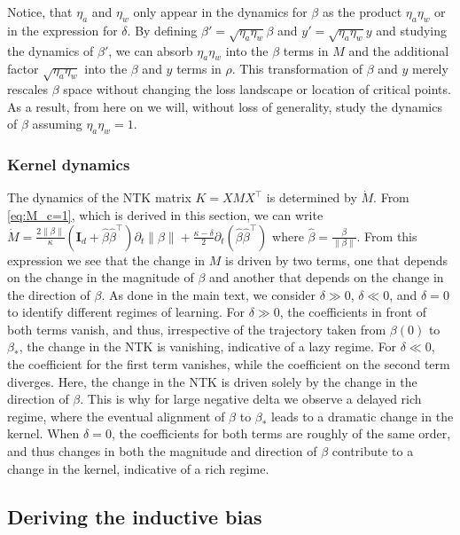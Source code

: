 \documentclass{article}
\theoremstyle{plain}
\theoremstyle{definition}
\theoremstyle{remark}
\begin{document}
Notice, that $\eta_a$ and $\eta_w$ only appear in the dynamics for $\beta$ as the product $\eta_a\eta_w$ or in the expression for $\delta$.
%
By defining $\beta' = \sqrt{\eta_a\eta_w} \beta$ and $y' = \sqrt{\eta_a\eta_w} y$ and studying the dynamics of $\beta'$, we can absorb $\eta_a\eta_w$ into the $\beta$ terms in $M$ and the additional factor $\sqrt{\eta_a\eta_w}$ into the $\beta$ and $y$ terms in $\rho$.
%
This transformation of $\beta$ and $y$ merely rescales $\beta$ space without changing the loss landscape or location of critical points. 
%
As a result, from here on we will, without loss of generality, study the dynamics of $\beta$ assuming $\eta_a\eta_w = 1$.

\subsubsection{Kernel dynamics}
\label{app:single-neuron-kernel}

The dynamics of the NTK matrix $K = X M X^\intercal$ is determined by $\dot{M}$. From \cref{eq:M_c=1}, which is derived in this section, we can write $\dot{M} = \frac{2 \|\beta\|}{\kappa} (\mathbf{I}_d + \hat{\beta}\hat{\beta}^\intercal) \partial_t \|\beta\| + \frac{\kappa - \delta}{2} \partial_t (\hat{\beta}\hat{\beta}^\intercal)$ where $\hat{\beta} = \tfrac{\beta}{\|\beta\|}$. From this expression we see that the change in $M$ is driven by two terms, one that depends on the change in the magnitude of $\beta$ and another that depends on the change in the direction of $\beta$. As done in the main text, we consider $\delta \gg 0$,  $\delta \ll 0$, and $\delta = 0$ to identify different regimes of learning. For $\delta \gg 0$, the coefficients in front of both terms vanish, and thus, irrespective of the trajectory taken from $\beta(0)$ to $\beta_*$, the change in the NTK is vanishing, indicative of a lazy regime. For $\delta \ll 0$, the coefficient for the first term vanishes, while the coefficient on the second term diverges. Here, the change in the NTK is driven solely by the change in the direction of $\beta$. This is why for large negative delta we observe a delayed rich regime, where the eventual alignment of $\beta$ to $\beta_*$ leads to a dramatic change in the kernel. When $\delta = 0$, the coefficients for both terms are roughly of the same order, and thus changes in both the magnitude and direction of $\beta$ contribute to a change in the kernel, indicative of a rich regime.



\subsection{Deriving the inductive bias}
\label{app:single-neuron-inductive-bias}
\end{document}
